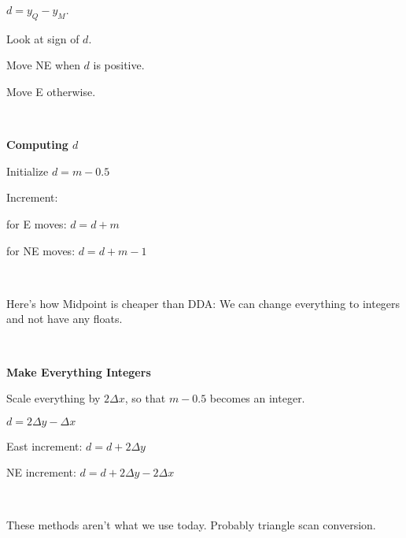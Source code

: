 $d = y_Q - y_M$.  

Look at sign of $d$.  

Move NE when $d$ is positive.

Move E otherwise.  

\

{\bf Computing $d$}

Initialize $d = m - 0.5$

Increment:

\qquad for E moves:  $d = d+m$

\qquad for NE moves:  $d = d + m - 1$

\

Here's how Midpoint is cheaper than DDA:  We can change everything to integers and not have any floats.  

\

{\bf Make Everything Integers}

Scale everything by $2 \Delta x$, so that $m - 0.5$ becomes an integer.  

$d = 2 \Delta y - \Delta x$

East increment:  $d = d + 2 \Delta y$

NE increment:  $d = d + 2 \Delta y - 2 \Delta x$

\

These methods aren't what we use today.  Probably triangle scan conversion.  

